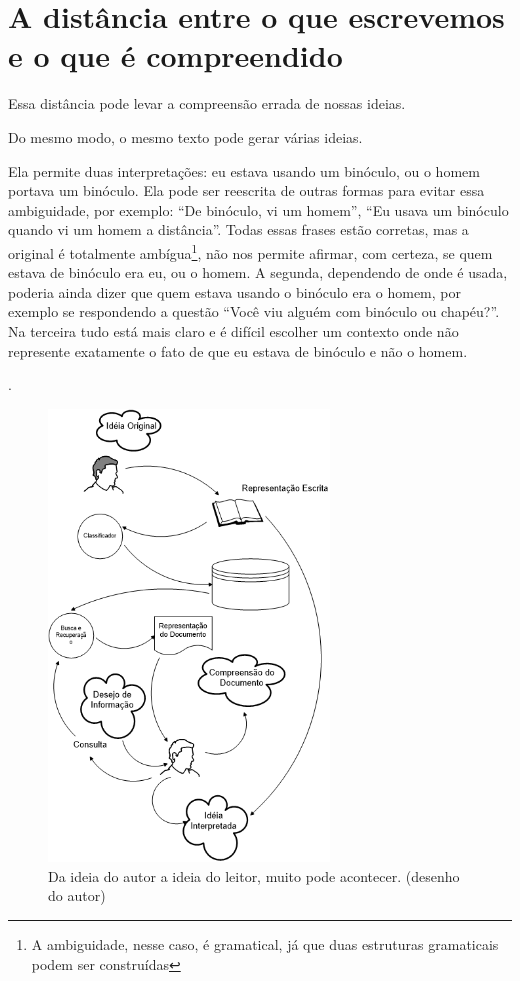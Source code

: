 \documentclass[openany]{book}
\begin{document}
\section{A distância entre o que escrevemos e o que é compreendido}

 Essa distância pode levar a compreensão errada de nossas ideias.

 Do mesmo modo, o mesmo texto pode gerar várias ideias.

Ela permite duas interpretações: eu estava usando um binóculo, ou o homem portava um binóculo. Ela pode ser reescrita de outras formas para evitar essa ambiguidade, por exemplo: \enquote{De binóculo, vi um homem}, \enquote{Eu usava um binóculo quando vi um homem a distância}. Todas essas frases estão corretas, mas a original é totalmente ambígua\footnote{A ambiguidade, nesse caso, é gramatical, já que duas estruturas gramaticais podem ser construídas}, não nos permite afirmar, com certeza, se quem estava de binóculo era eu, ou o homem. A segunda, dependendo de onde é usada, poderia ainda dizer que quem estava usando o binóculo era o homem, por exemplo se respondendo a questão ``Você viu alguém com binóculo ou chapéu?''.
Na terceira tudo está mais claro e é difícil escolher um contexto onde não represente exatamente o fato de que eu estava de binóculo e não o homem.

.

\begin{figure}
    \centering
    \includegraphics[height=12cm]{imagens/textretrieval.png}
    \caption{Da ideia do autor a ideia do leitor, muito pode acontecer. (desenho do autor)}
    \label{fig:tr1}
\end{figure}
\end{document}
